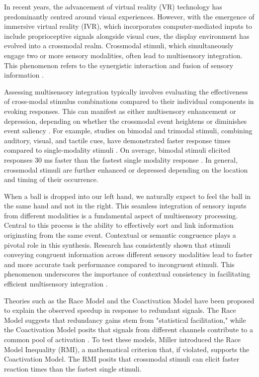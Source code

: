 \documentclass[12pt,oneside,openright]{report}
\begin{document}
In recent years, the advancement of virtual reality (VR) technology has predominantly centred around visual experiences. However, with the emergence of immersive virtual reality (IVR), which incorporates computer-mediated inputs to include proprioceptive signals alongside visual cues, the display environment has evolved into a crossmodal realm. Crossmodal stimuli, which simultaneously engage two or more sensory modalities, often lead to multisensory integration. This phenomenon refers to the synergistic interaction and fusion of sensory information \parencite{Stein2008MultisensoryIC}.

Assessing multisensory integration typically involves evaluating the effectiveness of cross-modal stimulus combinations compared to their individual components in evoking responses. This can manifest as either multisensory enhancement or depression, depending on whether the crossmodal event heightens or diminishes event saliency \parencite{Stein2008MultisensoryIC}. For example, studies on bimodal and trimodal stimuli, combining auditory, visual, and tactile cues, have demonstrated faster response times compared to single-modality stimuli \parencite{Diederich2004BimodalAT}. On average, bimodal stimuli elicited responses 30 ms faster than the fastest single modality response \parencite{Diederich2004BimodalAT}. In general, crossmodal stimuli are further enhanced or depressed depending on the location and timing of their occurrence.

When a ball is dropped into our left hand, we naturally expect to feel the ball in the same hand and not in the right. This seamless integration of sensory inputs from different modalities is a fundamental aspect of multisensory processing. Central to this process is the ability to effectively sort and link information originating from the same event. Contextual or semantic congruence plays a pivotal role in this synthesis. Research has consistently shown that stimuli conveying congruent information across different sensory modalities lead to faster and more accurate task performance compared to incongruent stimuli. This phenomenon underscores the importance of contextual consistency in facilitating efficient multisensory integration \parencite{Laurienti2003CrossmodalSP}.

Theories such as the Race Model and the Coactivation Model have been proposed to explain the observed speedup in response to redundant signals. The Race Model suggests that redundancy gains stem from "statistical facilitation," while the Coactivation Model posits that signals from different channels contribute to a common pool of activation \textcite{MILLER1982247}. To test these models, Miller introduced the Race Model Inequality (RMI), a mathematical criterion that, if violated, supports the Coactivation Model. The RMI posits that crossmodal stimuli can elicit faster reaction times than the fastest single stimuli.
\end{document}
